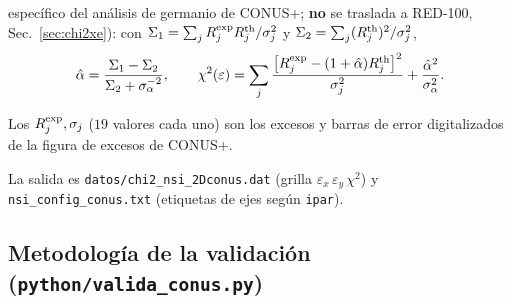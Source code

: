 \documentclass[11pt,a4paper]{article}
\newcommand{\eps}{\varepsilon}
\newcommand{\code}[1]{\texttt{#1}}
\newcommand{\Rexp}{R^{\rm exp}}
\newcommand{\Rth}{R^{\rm th}}
\begin{document}
\begin{enumerate}
\begin{itemize}
        espec\'ifico del an\'alisis de germanio de CONUS+; \textbf{no} se
        traslada a RED-100, Sec.~\ref{sec:chi2xe}): con
        $\Sigma_{1}=\sum_{j}\Rexp_{j}\Rth_{j}/\sigma_{j}^{2}$ y
        $\Sigma_{2}=\sum_{j}(\Rth_{j})^{2}/\sigma_{j}^{2}$,
        \begin{equation}
          \label{eq:alpha_conus}
          \hat\alpha
          = \frac{\Sigma_{1} - \Sigma_{2}}
                 {\Sigma_{2} + \sigma_{\alpha}^{-2}},
          \qquad
          \chi^{2}(\eps)
          = \sum_{j}
            \frac{\bigl[\Rexp_{j} - (1+\hat\alpha)\Rth_{j}\bigr]^{2}}
                 {\sigma_{j}^{2}}
          + \frac{\hat\alpha^{2}}{\sigma_{\alpha}^{2}}.
        \end{equation}
    \end{itemize}
    Los $\Rexp_{j},\sigma_{j}$ ($19$ valores cada uno) son los excesos y barras
    de error digitalizados de la figura de excesos de CONUS+.
\end{enumerate}
La salida es \code{datos/chi2\_nsi\_2Dconus.dat} (grilla $\eps_{x}\,\eps_{y}\,
\chi^{2}$) y \code{nsi\_config\_conus.txt} (etiquetas de ejes seg\'un
\code{ipar}).

\subsection{Metodolog\'ia de la validaci\'on (\code{python/valida\_conus.py})}
\label{sec:valida}
\end{document}
